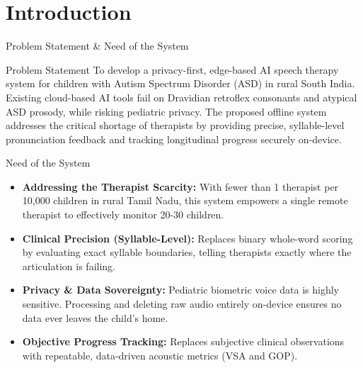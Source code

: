 \documentclass[aspectratio=169, 11pt, xcolor=table]{beamer}
\begin{document}
\section{Introduction}
\begin{frame}{Problem Statement \& Need of the System}
    \vspace{-2mm}
    \begin{block}{\small Problem Statement}
        \small 
        To develop a privacy-first, edge-based AI speech therapy system for children with Autism Spectrum Disorder (ASD) in rural South India. Existing cloud-based AI tools fail on Dravidian retroflex consonants and atypical ASD prosody, while risking pediatric privacy. The proposed offline system addresses the critical shortage of therapists by providing precise, syllable-level pronunciation feedback and tracking longitudinal progress securely on-device.
    \end{block}

    \vspace{2mm}

    \begin{block}{\small Need of the System}
        \footnotesize
        \begin{itemize}
            \setlength{\itemsep}{4pt}
            \item \textbf{Addressing the Therapist Scarcity:} With fewer than 1 therapist per 10,000 children in rural Tamil Nadu, this system empowers a single remote therapist to effectively monitor 20-30 children.
            \item \textbf{Clinical Precision (Syllable-Level):} Replaces binary whole-word scoring by evaluating exact syllable boundaries, telling therapists exactly where the articulation is failing.
            \item \textbf{Privacy \& Data Sovereignty:} Pediatric biometric voice data is highly sensitive. Processing and deleting raw audio entirely on-device ensures no data ever leaves the child's home.
            \item \textbf{Objective Progress Tracking:} Replaces subjective clinical observations with repeatable, data-driven acoustic metrics (VSA and GOP).
        \end{itemize}
    \end{block}
\end{frame}
\end{document}
